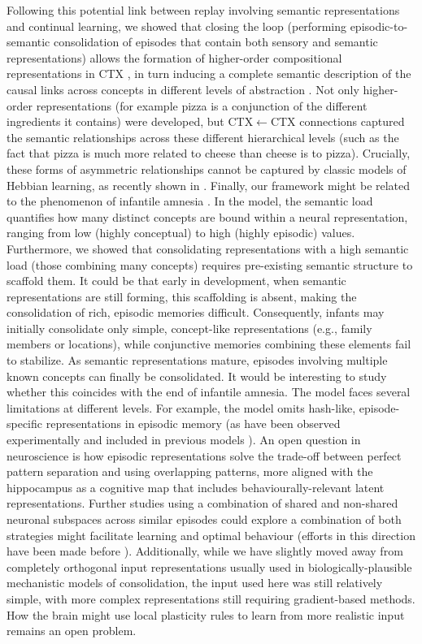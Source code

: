 \documentclass{article}
\begin{document}
Following this potential link between replay involving semantic representations and continual learning, we showed that closing the loop (performing episodic-to-semantic consolidation of episodes that contain both sensory and semantic representations) allows the formation of higher-order compositional representations in CTX , in turn inducing a complete semantic description of the causal links across concepts in different levels of abstraction . Not only higher-order representations (for example pizza is a conjunction of the different ingredients it contains) were developed, but CTX$\leftarrow$CTX connections captured the semantic relationships across these different hierarchical levels (such as the fact that pizza is much more related to cheese than cheese is to pizza). Crucially, these forms of asymmetric relationships cannot be captured by classic models of Hebbian learning, as recently shown in . Finally, our framework might be related to the phenomenon of infantile amnesia . In the model, the semantic load quantifies how many distinct concepts are bound within a neural representation, ranging from low (highly conceptual) to high (highly episodic) values. Furthermore, we showed that consolidating representations with a high semantic load (those combining many concepts) requires pre-existing semantic structure to scaffold them. It could be that early in development, when semantic representations are still forming, this scaffolding is absent, making the consolidation of rich, episodic memories difficult. Consequently, infants may initially consolidate only simple, concept-like representations (e.g., family members or locations), while conjunctive memories combining these elements fail to stabilize. As semantic representations mature, episodes involving multiple known concepts can finally be consolidated. It would be interesting to study whether this coincides with the end of infantile amnesia.
\newline\newline
The model faces several limitations at different levels. For example, the model omits hash-like, episode-specific representations in episodic memory (as have been observed experimentally  and included in previous models ). An open question in neuroscience is how episodic representations solve the trade-off between perfect pattern separation and using overlapping patterns, more aligned with the hippocampus as a cognitive map that includes behaviourally-relevant latent representations. Further studies using a combination of shared and non-shared neuronal subspaces across similar episodes could explore a combination of both strategies might facilitate learning and optimal behaviour (efforts in this direction have been made before ). Additionally, while we have slightly moved away from completely orthogonal input representations usually used in biologically-plausible mechanistic models of consolidation, the input used here was still relatively simple, with more complex representations still requiring gradient-based methods. How the brain might use local plasticity rules to learn from more realistic input remains an open problem.
\end{document}
